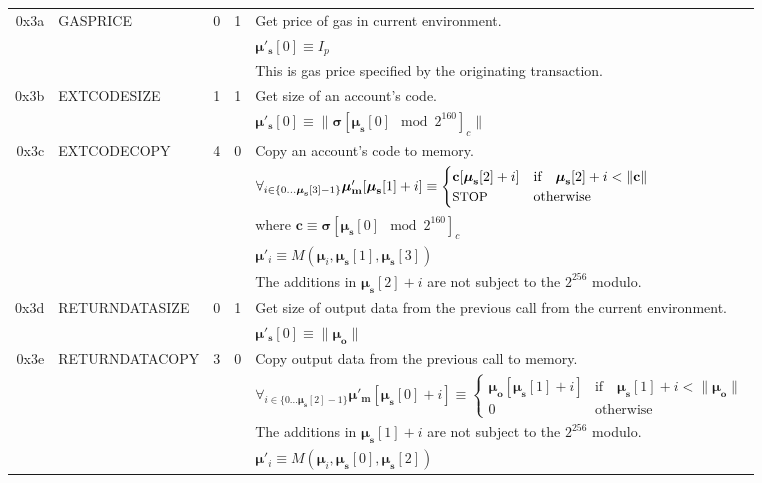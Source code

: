 \documentclass[9pt,oneside]{amsart}
\begin{document}
\begin{tabular*}{\columnwidth}[h]{rlrrl}
\midrule
0x3a & {\small GASPRICE} & 0 & 1 & Get price of gas in current environment. \\
&&&& $\boldsymbol{\mu}'_\mathbf{s}[0] \equiv I_p$ \\
&&&& This is gas price specified by the originating transaction.\\
\midrule
0x3b & {\small EXTCODESIZE} & 1 & 1 & Get size of an account's code. \\
&&&& $\boldsymbol{\mu}'_\mathbf{s}[0] \equiv \lVert \boldsymbol{\sigma}[\boldsymbol{\mu}_\mathbf{s}[0] \mod 2^{160}]_c \rVert$ \\
\midrule
0x3c & {\small EXTCODECOPY} & 4 & 0 & Copy an account's code to memory. \\
&&&& $\forall_{i \in \{ 0 \dots \boldsymbol{\mu}_\mathbf{s}[3] - 1\} } \boldsymbol{\mu}'_\mathbf{m}[\boldsymbol{\mu}_\mathbf{s}[1] + i ] \equiv
\begin{cases} \mathbf{c}[\boldsymbol{\mu}_\mathbf{s}[2] + i] & \text{if} \quad \boldsymbol{\mu}_\mathbf{s}[2] + i < \lVert \mathbf{c} \rVert \\ \text{\small STOP} & \text{otherwise} \end{cases}$\\
&&&& where $\mathbf{c} \equiv \boldsymbol{\sigma}[\boldsymbol{\mu}_\mathbf{s}[0] \mod 2^{160}]_c$ \\
&&&& $\boldsymbol{\mu}'_i \equiv M(\boldsymbol{\mu}_i, \boldsymbol{\mu}_\mathbf{s}[1], \boldsymbol{\mu}_\mathbf{s}[3])$ \\
&&&& The additions in $\boldsymbol{\mu}_\mathbf{s}[2] + i$ are not subject to the $2^{256}$ modulo. \\
\midrule
0x3d & {\small RETURNDATASIZE} & 0 & 1 & Get size of output data from the previous call from the current environment. \\
&&&& $\boldsymbol{\mu}'_\mathbf{s}[0] \equiv \lVert \boldsymbol{\mu}_\mathbf{o} \rVert$ \\
\midrule
0x3e & {\small RETURNDATACOPY} & 3 & 0 & Copy output data from the previous call to memory. \\
&&&& $\forall_{i \in \{ 0 \dots \boldsymbol{\mu}_\mathbf{s}[2] - 1\} } \boldsymbol{\mu}'_\mathbf{m}[\boldsymbol{\mu}_\mathbf{s}[0] + i ] \equiv
\begin{cases} \boldsymbol{\mu}_\mathbf{o}[\boldsymbol{\mu}_\mathbf{s}[1] + i] & \text{if} \quad \boldsymbol{\mu}_\mathbf{s}[1] + i < \lVert \boldsymbol{\mu}_\mathbf{o} \rVert \\ 0 & \text{otherwise} \end{cases}$\\
&&&& The additions in $\boldsymbol{\mu}_\mathbf{s}[1] + i$ are not subject to the $2^{256}$ modulo. \\
&&&& $\boldsymbol{\mu}'_i \equiv M(\boldsymbol{\mu}_i, \boldsymbol{\mu}_\mathbf{s}[0], \boldsymbol{\mu}_\mathbf{s}[2])$ \\
\bottomrule
\end{tabular*}
\end{document}
